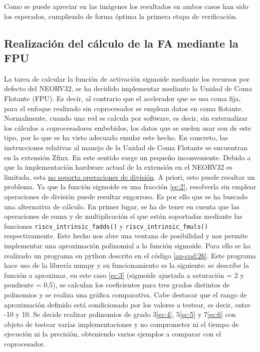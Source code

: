 Como se puede apreciar en las imágenes los resultados en ambos casos han sido los esperados, cumpliendo de forma óptima la primera etapa de verificación.

\subsection{Realización del cálculo de la FA mediante la FPU}

\label{fpu-fa}

La tarea de calcular la función de activación sigmoide mediante los recursos por defecto del NEORV32, se ha decidido implementar mediante la Unidad de Coma Flotante (FPU).
Es decir, al contrario que el acelerador que se usa coma fija, para el enfoque realizado sin coprocesador se emplean datos en coma flotante.
Normalmente, cuando una red se calcula por software, es decir, sin externalizar los cálculos a coprocesadores embebidos, los datos que se suelen usar son de este tipo, por lo que se ha visto adecuado emular este hecho.
En concreto, las instrucciones relativas al manejo de la Unidad de Coma Flotante se encuentran en la extensión Zfinx.
En este sentido surge un pequeño inconveniente.
Debido a que la implementación hardware actual de la extensión en el NEORV32 es limitada, esta \href{https://stnolting.github.io/neorv32/#_zfinx_isa_extension}{no soporta operaciones de división}.
A priori, esto puede resultar un problema.
Ya que la función sigmoide es una fracción \eqref{ec:2}, resolverla sin emplear operaciones de división puede resultar engorroso.
Es por ello que se ha buscado una alternativa de cálculo.
En primer lugar, se ha de tener en cuenta que las operaciones de suma y de multiplicación sí que están soportadas mediante las funciones \texttt{riscv_intrinsic_fadds()} y \texttt{riscv_intrinsic_fmuls()} respectivamente.
Este hecho nos abre una ventana de posibilidad y nos permite implementar una aproximación polinomial a la función sigmoide.
Para ello se ha realizado un programa en python descrito en el código \ref{ap-cod:26}.
Este programa hace uso de la librería numpy y su funcionamiento es la siguiente: se describe la función a aproximar, en este caso \eqref{ec:3} (sigmoide ajustada a saturación = 2 y pendiente = 0,5), se calculan los coeficientes para tres grados distintos de polinomios y se realiza una gráfica comparativa.
Cabe destacar que el rango de aproximación definido está condicionado por los valores a testear, es decir, entre -10 y 10.
Se decide realizar polinomios de grado 3\eqref{ec:4}, 5\eqref{ec:5} y 7\eqref{ec:6} con objeto de testear varías implementaciones y no comprometer ni el tiempo de ejecución ni la precisión, obteniendo varios ejemplos a comparar con el coprocesador. 

